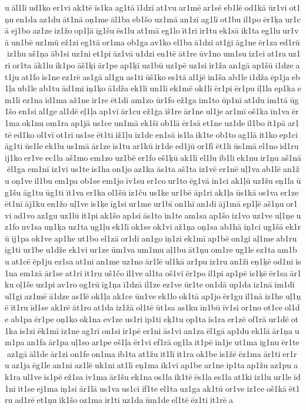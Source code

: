 u āl1lī ud1ko er1vi ak1tē īs1ka ag1tā ī1dzī at1vu ar1mē ar1sē eb1lē od1kā ūr1vi ot1ņu en1da az1du āt1nā oņ1me āl1ba eb1šo uz1mā an1zī ag1lī ot1bu il1po ēr1ķa ur1cā ej1bo az1ze iz1žo op1ļā īg1šu ēs1lu at1mā eg1lo īt1ri ir1tu ek1sā ik1ta eg1lu ur1vā un1bē uz1mū ež1zi eg1tā or1ma ob1ga av1ko el1ba ā1dzi at1ģi āg1ne ēr1za ed1rū iz1hu aš1ņa āb1si uz1ni et1pi āz1vā u1dzi en1tē āt1re ūv1no um1su iz1ci at1ra uz1ri or1ta āk1lu ik1po āš1ķi ār1pe ap1ķī uz1bū uz1pē uz1si ir1ža an1gā ap1šū i1dze at1ju at1fo is1ne ez1rē as1gā al1gu as1ti ūš1ko es1tā al1jē in1ša ab1le i1dža ēp1ja eb1ļa ub1le ab1tu ād1mi iņ1ķo ā1dža ek1li un1li ek1mē ok1lī ēr1pi ēr1pu iļ1la ep1ka em1li ez1na id1ma až1ne ir1re ēt1di am1zo ūr1fo ež1ga im1to ūp1nī at1du im1tā ūg1šo en1si al1ge al1dē eļ1ļa ap1vī ār1cu ež1ģa iš1re ār1ne ul1je ar1mī oš1ka īn1va ēr1ma ok1nu om1ra ap1jā us1ce un1mā ek1ši ob1lā ēr1sā et1ne uz1de il1bo it1pā ar1tē ed1ko ol1vī ot1rī us1se ēt1ti iž1ļu īz1de en1sā is1la ik1te ob1to ag1lā it1ko ep1ci āg1ti ūs1le ek1lu us1mā ār1ze īs1tu ar1kū ir1de ed1jū or1fī ēt1li ūs1mā el1no id1ru ij1ko er1ve ec1la aš1mo em1zo uz1bē er1fo eš1ķū ak1lī el1lu ib1li ek1nu ir1ņu aš1nā ēl1ga em1nī iz1vi us1te is1ha on1jo az1ka ās1ta aš1ta iz1vē er1nē uļ1va ab1lē an1žu oņ1ve il1bu em1pa ob1se em1jo īv1su er1co ur1to ēg1vā in1ci ak1ļū uz1šu eņ1la ūg1šu āg1tu ūg1ti īt1va er1ka ol1šū iz1ču us1ke ur1bē āp1ri ak1ļa ūs1kā os1va er1ze ēt1nī āj1ku en1žo uļ1ve is1ķe īg1si ur1me ur1bī on1hī an1di āj1mā ep1ļē aš1ņu or1vi ad1vo az1gu uz1lū it1pi ak1šo ap1si ās1to in1te am1sa ap1šo iz1vo uz1ve uļ1ņe uz1fo uv1sa uņ1ķa uz1ta ug1ļu ek1lī ok1se ok1vi až1ņa oņ1sa ab1hā iņ1ci ug1šā ek1rū ij1pa ok1ve ap1he ut1bo el1zā or1di an1go iņ1zi ek1mī ap1bē on1gi aļ1me ab1ru ig1ti ur1be u1dže ek1vi ur1ze ūm1va um1mu aļ1bu āt1ņu om1re ug1le ez1ta am1bu at1cē ēp1ju ez1sa at1ni an1me uz1no ār1lē ul1kā ar1pu iz1ru an1ži eņ1ķē od1ni is1na em1zā ār1se at1ri it1ru uš1čo il1ve al1ta oš1vī ēr1po il1pi ap1pē is1ķē ēr1sa ār1ku oļ1še uz1pi av1ro og1rū īg1ņa ī1dzā il1ze ez1ve ūr1te on1dā up1da iz1nā im1di ul1gi az1mē ā1dze as1lē ok1ļa ak1ce ūn1ve ek1lo ok1tā ap1jo ēr1gu il1nā iz1he uļ1ņē īt1ru īd1se ak1rē āt1ro at1da iz1žā ol1tē ūt1sa as1ku īn1bū īv1si or1no ot1ce ol1de ab1pa ēr1pe oņ1ko ok1na ev1ze us1ri ip1ti eķ1tu op1ta īs1ra er1zē of1rā ur1dē ot1ka is1zi ēk1mī iz1ne ag1rī on1si ir1pē er1ni ās1vi an1za ēl1gā ap1du ek1lā ār1ņa um1pa an1fa ār1pa uļ1so ar1pe eš1ļa ēr1vi ef1rā og1la it1pē in1je ut1ma ig1nu ēr1te az1gā āl1de ār1zi on1fe on1ma ib1ta at1žu it1lī it1ra ok1be is1žē ēz1ma ār1ti er1ru az1ja ēg1le an1ni az1lē uk1ni at1lī eņ1ma ik1vī ap1be ar1ne ip1ta ap1žu az1pu ak1ra ul1ve is1pē ež1sa iv1ma ār1šu ek1na os1la ik1tē ēs1la es1la at1ki iz1lu ur1le īd1ni it1se ej1ma iņ1si ār1lā us1va us1ci if1te el1ta uz1ga ak1tū or1ve iz1ce oš1kā ēt1ru ad1rē et1ņu ik1šo oz1ma ir1ti uz1da ūm1de el1tē ēz1ti it1rē a